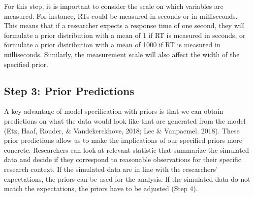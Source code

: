 \documentclass[
  english,
  doc,floatsintext]{apa6}
\begin{document}
For this step, it is important to consider the scale on which variables are measured. For instance, RTs could be measured in seconds or in milliseconds. This means that if a researcher expects a response time of one second, they will formulate a prior distribution with a mean of 1 if RT is measured in seconds, or formulate a prior distribution with a mean of 1000 if RT is measured in milliseconds. Similarly, the measurement scale will also affect the width of the specified prior.

\hypertarget{step-3-prior-predictions}{%
\subsection{Step 3: Prior Predictions}\label{step-3-prior-predictions}}

A key advantage of model specification with priors is that we can obtain predictions on what the data would look like that are generated from the model (Etz, Haaf, Rouder, \& Vandekerckhove, 2018; Lee \& Vanpaemel, 2018). These prior predictions allow us to make the implications of our specified priors more concrete. Researchers can look at relevant statistic that summarize the simulated data and decide if they correspond to reasonable observations for their specific research context. If the simulated data are in line with the researchers' expectations, the priors can be used for the analysis. If the simulated data do not match the expectations, the priors have to be adjusted (Step 4).
\end{document}
